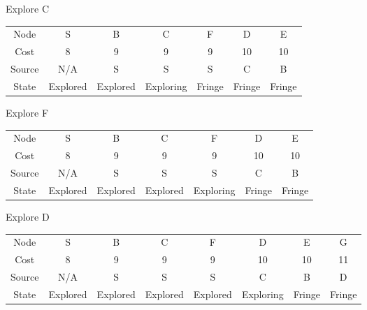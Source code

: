 \documentclass{article}
\begin{document}
\begin{enumerate}
        
        Explore C
        \newline
        \begin{left}
            \begin{tabular}{c|c|c|c|c|c|c}
            \hline
                Node & S & B & C & F & D & E\\
                Cost & 8 & 9 & 9 & 9 & 10 & 10\\
                Source & N/A & S & S & S & C & B \\
                State & Explored & Explored & Exploring & Fringe & Fringe & Fringe\\
            \hline
            \end{tabular}
        \end{left}
        \newline
        \newline
        
        
        Explore F
        \newline
        \begin{left}
            \begin{tabular}{c|c|c|c|c|c|c}
            \hline
                Node & S & B & C & F & D & E\\
                Cost & 8 & 9 & 9 & 9 & 10 & 10\\
                Source & N/A & S & S & S & C & B \\
                State & Explored & Explored & Explored & Exploring & Fringe & Fringe\\
            \hline
            \end{tabular}
        \end{left}
        \newline
        \newline
        
        
        Explore D
        \newline
        \begin{left}
            \begin{tabular}{c|c|c|c|c|c|c|c}
            \hline
                Node & S & B & C & F & D & E & G\\
                Cost & 8 & 9 & 9 & 9 & 10 & 10 & 11\\
                Source & N/A & S & S & S & C & B & D\\
                State & Explored & Explored & Explored & Explored & Exploring & Fringe & Fringe\\
            \hline
            \end{tabular}
        \end{left}
        \newline
        \newline
        

\end{enumerate}
\end{document}
